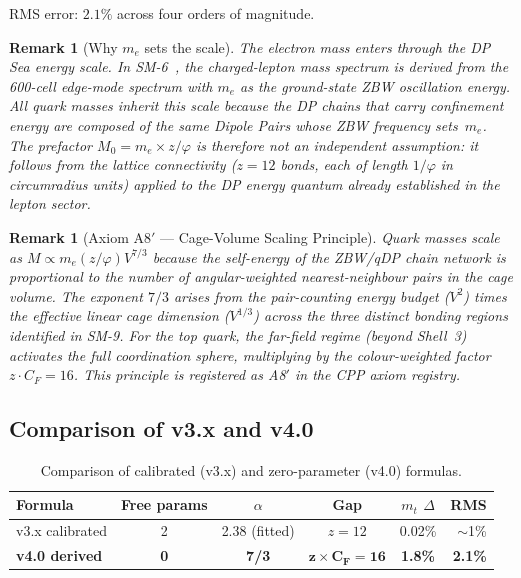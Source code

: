 \documentclass[11pt,letterpaper]{article}
\newtheorem{remark}[theorem]{Remark}
\newcommand{\phig}{\varphi}
\begin{document}
\noindent RMS error: $2.1\%$ across four orders of magnitude.

\begin{remark}[Why $m_e$ sets the scale]
The electron mass enters through the DP Sea energy scale.  In
SM-6~\citep{abshier2026sm6}, the charged-lepton mass spectrum is
derived from the 600-cell edge-mode spectrum with $m_e$ as the
ground-state ZBW oscillation energy.  All quark masses inherit this
scale because the DP chains that carry confinement energy are
composed of the same Dipole Pairs whose ZBW frequency sets~$m_e$.
The prefactor $M_0 = m_e \times z/\phig$ is therefore not an
independent assumption: it follows from the lattice connectivity
($z = 12$ bonds, each of length $1/\phig$ in circumradius units)
applied to the DP energy quantum already established in the
lepton sector.
\end{remark}

\begin{remark}[Axiom A8$'$ --- Cage-Volume Scaling Principle]
\label{rem:A8prime}
Quark masses scale as $M \propto m_e (z/\phig) V^{7/3}$ because
the self-energy of the ZBW/qDP chain network is proportional to
the number of angular-weighted nearest-neighbour pairs in the cage
volume.  The exponent $7/3$ arises from the pair-counting energy
budget ($V^2$) times the effective linear cage dimension
($V^{1/3}$) across the three distinct bonding regions identified
in SM-9.  For the top quark, the far-field regime (beyond Shell~3)
activates the full coordination sphere, multiplying by the
colour-weighted factor $z \cdot C_F = 16$.  This principle is
registered as A8$'$ in the CPP axiom registry.
\end{remark}

\subsection{Comparison of v3.x and v4.0}
\label{sec:reconcile}

\begin{table}[H]
\centering
\caption{Comparison of calibrated (v3.x) and zero-parameter (v4.0)
formulas.}
\label{tab:comparison}
\begin{tabular}{@{}lccccr@{}}
\toprule
Formula & Free params & $\alpha$ & Gap & $m_t$ $\Delta$ & RMS \\
\midrule
v3.x calibrated & 2 & 2.38 (fitted) & $z = 12$ & 0.02\% & $\sim$1\% \\
\textbf{v4.0 derived} & \textbf{0} & \textbf{7/3} & $\boldsymbol{z \times C_F = 16}$
  & \textbf{1.8\%} & \textbf{2.1\%} \\
\bottomrule
\end{tabular}
\end{table}
\end{document}
